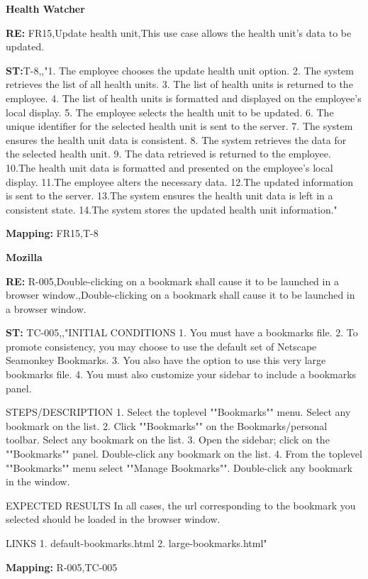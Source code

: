 \documentclass[conference]{IEEEtran}
\begin{document}
\textbf{Health Watcher}
 \begin{roundedBox-sm}
    \textbf{RE:} FR15,Update health unit,This use case allows the health unit's data to be updated.
    
    \textbf{ST:}T-8,,"1. The employee chooses the update health unit option.
2. The system retrieves the list of all health units.
3. The list of health units is returned to the employee.
4. The list of health units is formatted and displayed on the employee’s local display.
5. The employee selects the health unit to be updated.
6. The unique identifier for the selected health unit is sent to the server.
7. The system ensures the health unit data is consistent.
8. The system retrieves the data for the selected health unit.
9. The data retrieved is returned to the employee.
10.The health unit data is formatted and presented on the employee’s local display.
11.The employee alters the necessary data.
12.The updated information is sent to the server.
13.The system ensures the health unit data is left in a consistent state. 
14.The system stores the updated health unit information."
    
    \textbf{Mapping:} FR15,T-8
\end{roundedBox-sm}

\textbf{Mozilla}

\begin{roundedBox-sm}
    \textbf{RE:} R-005,Double-clicking on a bookmark shall cause it to be launched in a browser window.,Double-clicking on a bookmark shall cause it to be launched in a browser window.

    
    \textbf{ST:} TC-005,,"INITIAL CONDITIONS
1. You must have a bookmarks file.
2. To promote consistency, you may choose to use the default set of Netscape Seamonkey Bookmarks.
3. You also have the option to use this very large bookmarks file.
4. You must also customize your sidebar to include a bookmarks panel.

STEPS/DESCRIPTION
1. Select the toplevel ""Bookmarks"" menu. Select any bookmark on the list.
2. Click ""Bookmarks"" on the Bookmarks/personal toolbar. Select any bookmark on the list.
3. Open the sidebar; click on the ""Bookmarks"" panel. Double-click any bookmark on the list.
4. From the toplevel ""Bookmarks"" menu select ""Manage Bookmarks"". Double-click any bookmark in the window.

EXPECTED RESULTS
In all cases, the url corresponding to the bookmark you selected should be loaded in the browser window.

LINKS
1. default-bookmarks.html
2. large-bookmarks.html"

    \textbf{Mapping:} R-005,TC-005

\end{roundedBox-sm}
\end{document}
